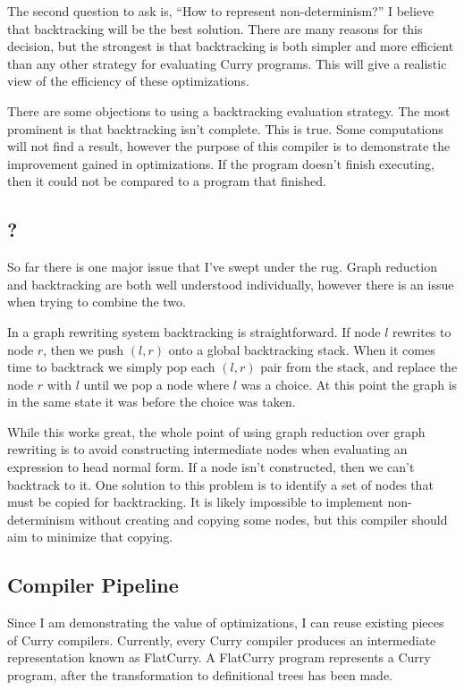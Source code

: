 The second question to ask is, ``How to represent non-determinism?''
I believe that backtracking will be the best solution.
There are many reasons for this decision, but the strongest is that backtracking
is both simpler and more efficient than any other strategy for evaluating Curry programs.
This will give a realistic view of the efficiency of these optimizations.

There are some objections to using a backtracking evaluation strategy.
The most prominent is that backtracking isn't complete.
This is true. Some computations will not find a result,
however the purpose of this compiler is to demonstrate the improvement gained in optimizations.
If the program doesn't finish executing, then it could not be compared to a program that finished.

\subsection{?}

So far there is one major issue that I've swept under the rug.
Graph reduction and backtracking are both well understood individually,
however there is an issue when trying to combine the two.

In a graph rewriting system backtracking is straightforward.
If node $l$ rewrites to node $r$, then we push $(l,r)$ onto a global backtracking stack.
When it comes time to backtrack we simply pop each $(l,r)$ pair from the stack, and
replace the node $r$ with $l$ until we pop a node where $l$ was a choice.
At this point the graph is in the same state it was before the choice was taken.

While this works great, the whole point of using graph reduction over graph rewriting
is to avoid constructing intermediate nodes when evaluating an expression to head normal form.
If a node isn't constructed, then we can't backtrack to it.
One solution to this problem is to identify a set of nodes that must be copied for backtracking.
It is likely impossible to implement non-determinism without creating and copying some nodes,
but this compiler should aim to minimize that copying.

\subsection{Compiler Pipeline}
Since I am demonstrating the value of optimizations, I can reuse existing pieces of Curry compilers.
Currently, every Curry compiler produces an intermediate representation known as FlatCurry.
A FlatCurry program represents a Curry program,
after the transformation to definitional trees has been made.

